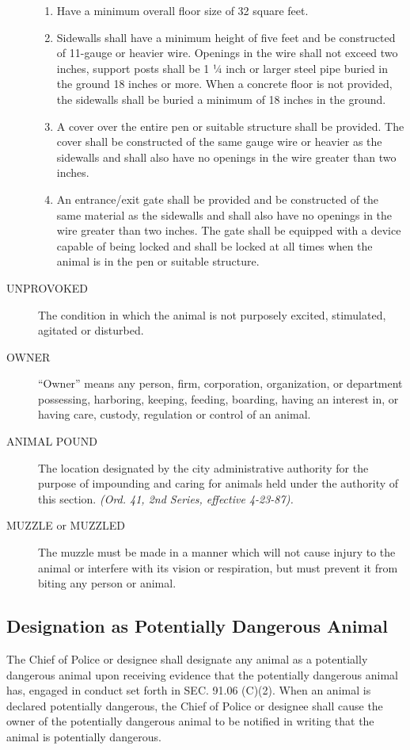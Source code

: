 \begin{description}
\begin{enumerate}
        \item Have a minimum overall floor size of 32 square feet.
        \item Sidewalls shall have a minimum height of five feet and be constructed of 11-gauge or heavier wire.  Openings in the wire shall not exceed two inches, support posts shall be 1 ¼ inch or larger steel pipe buried in the ground 18 inches or more.  When a concrete floor is not provided, the sidewalls shall be buried a minimum of 18 inches in the ground.
        \item A cover over the entire pen or suitable structure shall be provided.  The cover shall be constructed of the same gauge wire or heavier as the sidewalls and shall also have no openings in the wire greater than two inches.
        \item An entrance/exit gate shall be provided and be constructed of the same material as the sidewalls and shall also have no openings in the wire greater than two inches.  The gate shall be equipped with a device capable of being locked and shall be locked at all times when the animal is in the pen or suitable structure.
    \end{enumerate}
    \item[UNPROVOKED] The condition in which the animal is not purposely excited, stimulated, agitated or disturbed.
    \item[OWNER] “Owner” means any person, firm, corporation, organization, or department possessing, harboring, keeping, feeding, boarding, having an interest in, or having care, custody, regulation or control of an animal.
    \item[ANIMAL POUND] The location designated by the city administrative authority for the purpose of impounding and caring for animals held under the authority of this section.  \emph{(Ord. 41, 2nd Series, effective 4-23-87).}
    \item[MUZZLE or MUZZLED] The muzzle must be made in a manner which will not cause injury to the animal or interfere with its vision or respiration, but must prevent it from biting any person or animal.
\end{description}
\subsection{Designation as Potentially Dangerous Animal}
The Chief of Police or designee shall designate any animal as a potentially dangerous animal upon receiving evidence that the potentially dangerous animal has, engaged in conduct set forth in SEC. 91.06 (C)(2).  When an animal is declared potentially dangerous, the Chief of Police or designee shall cause the owner of the potentially dangerous animal to be notified in writing that the animal is potentially dangerous.
